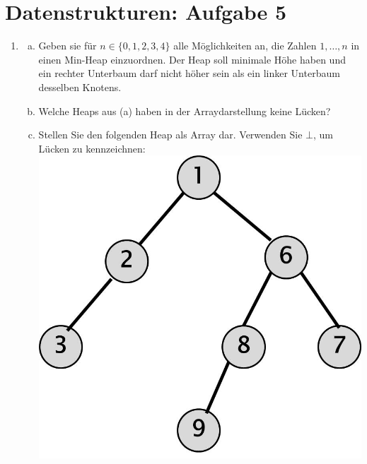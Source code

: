 \documentclass{scrartcl}
\begin{document}
\section*{Datenstrukturen: Aufgabe 5}
\begin{enumerate}[(1)]

\item
\begin{enumerate}[(a)]
\item Geben sie f\"ur $n\in \{0,1,2,3,4\}$ alle M\"oglichkeiten an, die Zahlen $1,\dots,n$ in einen Min-Heap einzuordnen. Der Heap soll minimale H\"ohe haben und ein rechter Unterbaum darf nicht h\"oher sein als ein linker Unterbaum desselben Knotens.
\item Welche Heaps aus (a) haben in der Arraydarstellung keine L\"ucken?
\item Stellen Sie den folgenden Heap als Array dar. Verwenden Sie $\bot$, um L\"ucken zu kennzeichnen:\newline
{\center\includegraphics[scale=0.3]{images/Heap.jpg}}
\end{enumerate}


\end{enumerate}
\end{document}
